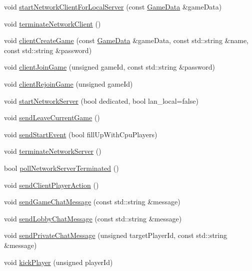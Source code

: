 \begin{DoxyCompactItemize}
\item 
void \hyperlink{class_session_a738cd5d6baccc583228e5bc57d57d80f}{start\-Network\-Client\-For\-Local\-Server} (const \hyperlink{struct_game_data}{Game\-Data} \&game\-Data)
\item 
void \hyperlink{class_session_ad74cf272a2adfaa0a2abcaf31dde167d}{terminate\-Network\-Client} ()
\item 
void \hyperlink{class_session_ae3a49af65eee53bfdb44896ab564458e}{client\-Create\-Game} (const \hyperlink{struct_game_data}{Game\-Data} \&game\-Data, const std\-::string \&name, const std\-::string \&password)
\item 
void \hyperlink{class_session_a4499bc9b022b6af7856ab23ab80d7f99}{client\-Join\-Game} (unsigned game\-Id, const std\-::string \&password)
\item 
void \hyperlink{class_session_a8084d3c69f25fb50c1b42efe07ccbeb7}{client\-Rejoin\-Game} (unsigned game\-Id)
\item 
void \hyperlink{class_session_abf1156cfe81e2786adf7bb369836ca0b}{start\-Network\-Server} (bool dedicated, bool lan\-\_\-local=false)
\item 
void \hyperlink{class_session_afe114af0a76eb150e0aad183eed5b8f1}{send\-Leave\-Current\-Game} ()
\item 
void \hyperlink{class_session_a0b43294e739dab7e8a70c1ed2e852e3d}{send\-Start\-Event} (bool fill\-Up\-With\-Cpu\-Players)
\item 
void \hyperlink{class_session_ab3c9282517142617d9daf5ea08768083}{terminate\-Network\-Server} ()
\item 
bool \hyperlink{class_session_a2277e79b82a29b4ec96aa78e1cb67e7c}{poll\-Network\-Server\-Terminated} ()
\item 
void \hyperlink{class_session_aac851088914580be19d0f9c84698cdb6}{send\-Client\-Player\-Action} ()
\item 
void \hyperlink{class_session_a9e297d28e45b056a09c62ef389308052}{send\-Game\-Chat\-Message} (const std\-::string \&message)
\item 
void \hyperlink{class_session_ae309f290cfefc4c2c145209b7a5a48ff}{send\-Lobby\-Chat\-Message} (const std\-::string \&message)
\item 
void \hyperlink{class_session_a756684d3fb7bc878f39250f5ddd3cc55}{send\-Private\-Chat\-Message} (unsigned target\-Player\-Id, const std\-::string \&message)
\item 
void \hyperlink{class_session_a383cac1e0db6fcbce4d3fa94b3efe9d4}{kick\-Player} (unsigned player\-Id)
\item 

\end{DoxyCompactItemize}

